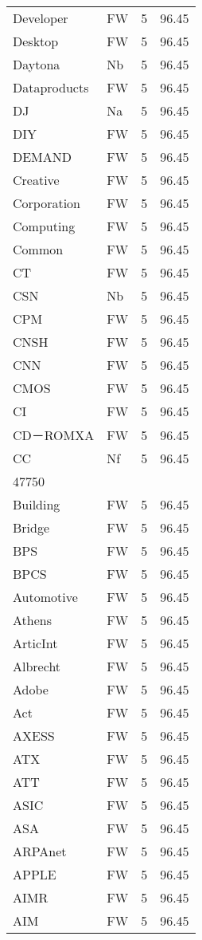 \documentclass[twocolumn]{book}
\begin{document}
\begin{supertabular}{llrr}
Developer & FW & 5 &  96.45\\
Desktop & FW & 5 &  96.45\\
Daytona & Nb & 5 &  96.45\\
Dataproducts & FW & 5 &  96.45\\
DJ & Na & 5 &  96.45\\
DIY & FW & 5 &  96.45\\
DEMAND & FW & 5 &  96.45\\
Creative & FW & 5 &  96.45\\
Corporation & FW & 5 &  96.45\\
Computing & FW & 5 &  96.45\\
Common & FW & 5 &  96.45\\
CT & FW & 5 &  96.45\\
CSN & Nb & 5 &  96.45\\
CPM & FW & 5 &  96.45\\
CNSH & FW & 5 &  96.45\\
CNN & FW & 5 &  96.45\\
CMOS & FW & 5 &  96.45\\
CI & FW & 5 &  96.45\\
CD－ROMXA & FW & 5 &  96.45\\
CC & Nf & 5 &  96.45\\
47750\\
Building & FW & 5 &  96.45\\
Bridge & FW & 5 &  96.45\\
BPS & FW & 5 &  96.45\\
BPCS & FW & 5 &  96.45\\
Automotive & FW & 5 &  96.45\\
Athens & FW & 5 &  96.45\\
ArticInt & FW & 5 &  96.45\\
Albrecht & FW & 5 &  96.45\\
Adobe & FW & 5 &  96.45\\
Act & FW & 5 &  96.45\\
AXESS & FW & 5 &  96.45\\
ATX & FW & 5 &  96.45\\
ATT & FW & 5 &  96.45\\
ASIC & FW & 5 &  96.45\\
ASA & FW & 5 &  96.45\\
ARPAnet & FW & 5 &  96.45\\
APPLE & FW & 5 &  96.45\\
AIMR & FW & 5 &  96.45\\
AIM & FW & 5 &  96.45\\

\end{supertabular}
\end{document}
